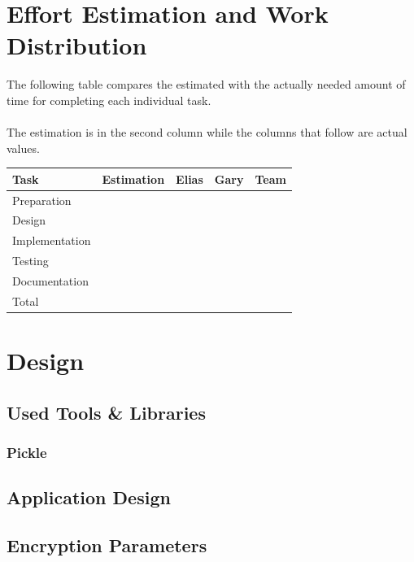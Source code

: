 \documentclass[11pt, a4paper]{article}
\begin{document}
\section{Effort Estimation and Work Distribution}

The following table compares the estimated with the actually needed
amount of time for completing each individual task.
\\\\
The estimation is in the second column while the columns that follow
are actual values.

\parskip 12pt
\begin{tabular} {| l | c | c | c | c |}
	\hline
	Task					&	Estimation		& 	Elias 	& 	Gary 	& 	Team	\\ \hline \hline
	Preparation				&					&			&  			&			\\ \hline
	Design					&					&			&			&			\\ \hline
	Implementation			&					&			&			& 	 		\\ \hline
	Testing					&					&			& 			& 	 		\\ \hline
	Documentation			&					&			&			& 			\\ \hline 
	Total					&					&			&			& 			\\
	\hline
\end{tabular}

\newpage

\section{Design}
\label{sec:design}
\subsection{Used Tools \& Libraries}

\subsubsection{Pickle}

\subsection{Application Design}



\subsection{Encryption Parameters}
\end{document}
